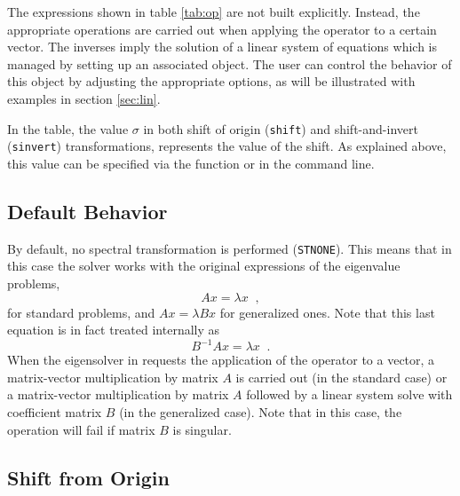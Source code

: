 	The expressions shown in table \ref{tab:op} are not built explicitly. Instead, the appropriate operations are carried out when applying the operator to a certain vector. The inverses imply the solution of a linear system of equations which is managed by setting up an associated  object. The user can control the behavior of this object by adjusting the appropriate options, as will be illustrated with examples in section \ref{sec:lin}.

	In the table, the value $\sigma$ in both shift of origin (\texttt{shift}) and shift-and-invert (\texttt{sinvert}) transformations, represents the value of the shift. As explained above, this value can be specified via the  function or in the command line.

\subsection{Default Behavior}

	By default, no spectral transformation is performed (\texttt{STNONE}). This means that in this case the solver works with the original expressions of the eigenvalue problems,
\begin{equation}Ax=\lambda x\;\;,\end{equation}
for standard problems, and $Ax=\lambda Bx$ for generalized ones. Note that this last equation is in fact treated internally as
\begin{equation}B^{-1}Ax=\lambda x\;\;.\end{equation}
When the eigensolver in  requests the application of the operator to a vector, a matrix-vector multiplication by matrix $A$ is carried out (in the standard case) or a matrix-vector multiplication by matrix $A$ followed by a linear system solve with coefficient matrix $B$ (in the generalized case). Note that in this case, the operation will fail if matrix $B$ is singular.

\subsection{Shift from Origin}

